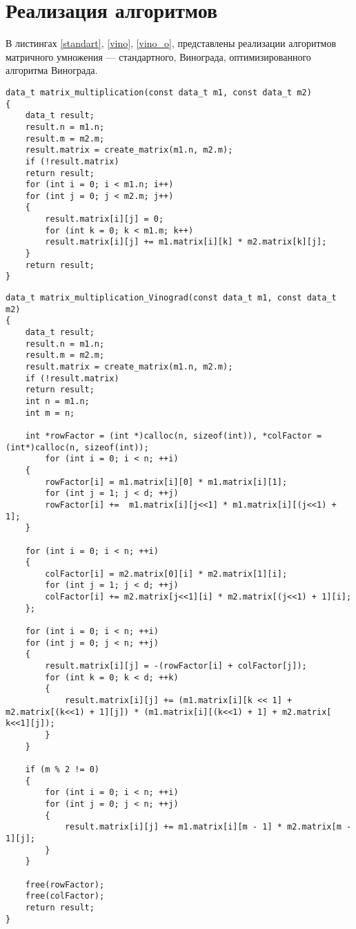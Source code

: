\section{Реализация алгоритмов}
В листингах \ref{standart}, \ref{vino}, \ref{vino_o}, представлены реализации алгоритмов матричного умножения --- стандартного, Винограда, оптимизированного алгоритма Винограда. 
\begin{center}
\begin{lstlisting}[label=standart, caption={Стандартный алгоритм умножения матриц}]
data_t matrix_multiplication(const data_t m1, const data_t m2)
{
	data_t result;
	result.n = m1.n;
	result.m = m2.m;
	result.matrix = create_matrix(m1.n, m2.m);
	if (!result.matrix)
	return result;
	for (int i = 0; i < m1.n; i++)
	for (int j = 0; j < m2.m; j++)
	{
		result.matrix[i][j] = 0;
		for (int k = 0; k < m1.m; k++)
		result.matrix[i][j] += m1.matrix[i][k] * m2.matrix[k][j];
	}
	return result;
}
\end{lstlisting}
\end{center}
\newpage
\begin{center}
\begin{lstlisting}[label=vino, caption={Алгоритм Винограда умножения матриц}]
data_t matrix_multiplication_Vinograd(const data_t m1, const data_t m2)
{
	data_t result;
	result.n = m1.n;
	result.m = m2.m;
	result.matrix = create_matrix(m1.n, m2.m);
	if (!result.matrix)
	return result;
	int n = m1.n;
	int m = n;
	
	int *rowFactor = (int *)calloc(n, sizeof(int)), *colFactor = (int*)calloc(n, sizeof(int));
		for (int i = 0; i < n; ++i)
	{
		rowFactor[i] = m1.matrix[i][0] * m1.matrix[i][1];
		for (int j = 1; j < d; ++j)
		rowFactor[i] +=  m1.matrix[i][j<<1] * m1.matrix[i][(j<<1) + 1];
	}
	
	for (int i = 0; i < n; ++i)
	{
		colFactor[i] = m2.matrix[0][i] * m2.matrix[1][i];
		for (int j = 1; j < d; ++j)
		colFactor[i] += m2.matrix[j<<1][i] * m2.matrix[(j<<1) + 1][i];
	};
	
	for (int i = 0; i < n; ++i)
	for (int j = 0; j < n; ++j)
	{
		result.matrix[i][j] = -(rowFactor[i] + colFactor[j]);
		for (int k = 0; k < d; ++k)
		{
			result.matrix[i][j] += (m1.matrix[i][k << 1] + m2.matrix[(k<<1) + 1][j]) * (m1.matrix[i][(k<<1) + 1] + m2.matrix[ k<<1][j]);
		}
	}
	
	if (m % 2 != 0)
	{
		for (int i = 0; i < n; ++i)
		for (int j = 0; j < n; ++j)
		{
			result.matrix[i][j] += m1.matrix[i][m - 1] * m2.matrix[m - 1][j];
		}
	}

	free(rowFactor);
	free(colFactor);
	return result;
}
\end{lstlisting}
\end{center}
